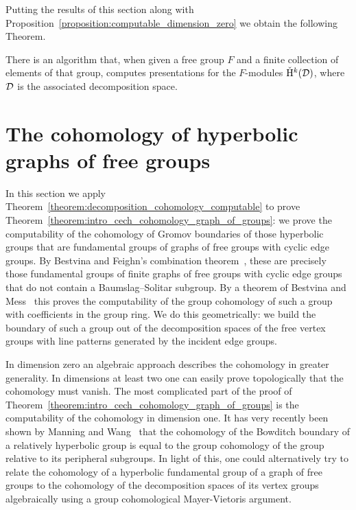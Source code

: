 Putting the results of this section along with Proposition~\ref{proposition:computable_dimension_zero} we obtain the following Theorem.

\begin{theorem}\label{theorem:decomposition_cohomology_computable}
  There is an algorithm that, when given a free group $F$ and a finite collection of elements of that group, computes presentations for the $F$-modules $\check{\mathrm{H}}{}^k(\mathcal{D})$, where $\mathcal{D}$ is the associated decomposition space.
\end{theorem}

\section{The cohomology of hyperbolic graphs of free groups}\label{section:graphs_of_free_groups}

In this section we apply Theorem~\ref{theorem:decomposition_cohomology_computable} to prove Theorem~\ref{theorem:intro_cech_cohomology_graph_of_groups}: we prove the computability of the \vCech{} cohomology of Gromov boundaries of those hyperbolic groups that are fundamental groups of graphs of free groups with cyclic edge groups.
By Bestvina and Feighn's combination theorem~\cite{bestvinafeighn92}, these are precisely those fundamental groups of finite graphs of free groups with cyclic edge groups that do not contain a Baumslag--Solitar subgroup.
By a theorem of Bestvina and Mess~\cite{bestvinamess91} this proves the computability of the group cohomology of such a group with coefficients in the group ring.
We do this geometrically: we build the boundary of such a group out of the decomposition spaces of the free vertex groups with line patterns generated by the incident edge groups.

In dimension zero an algebraic approach describes the cohomology in greater generality.
In dimensions at least two one can easily prove topologically that the cohomology must vanish.
The most complicated part of the proof of Theorem~\ref{theorem:intro_cech_cohomology_graph_of_groups} is the computability of the cohomology in dimension one.
It has very recently been shown by Manning and Wang~\cite{manningwang18} that the cohomology of the Bowditch boundary of a relatively hyperbolic group is equal to the group cohomology of the group relative to its peripheral subgroups.
In light of this, one could alternatively try to relate the cohomology of a hyperbolic fundamental group of a graph of free groups to the cohomology of the decomposition spaces of its vertex groups algebraically using a group cohomological Mayer-Vietoris argument.

